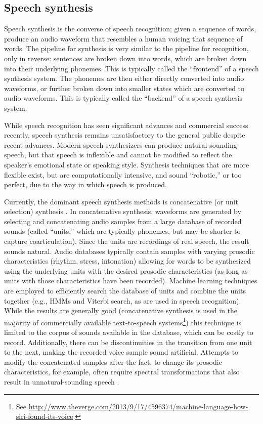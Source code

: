 \documentclass{article}
\begin{document}
\subsection{Speech synthesis}
\label{subsec:synthesis}

Speech synthesis is the converse
of speech recognition;
given a sequence of words,
produce an audio waveform
that resembles a human
voicing that sequence of words.
The pipeline for synthesis is very similar
to the pipeline for recognition,
only in reverse:
sentences are broken down into words,
which are broken down into
their underlying phonemes.
This is typically called the
``frontend'' of a speech synthesis system.
The phonemes are then either
directly converted into audio waveforms,
or further broken down into
smaller states which are converted to audio waveforms.
This is typically called the ``backend''
of a speech synthesis system.

While speech recognition
has seen significant advances
and commercial success recently,
speech synthesis remains
unsatisfactory to the general public
despite recent advances.
Modern speech synthesizers can
produce natural-sounding speech,
but that speech is inflexible
and cannot be modified
to reflect the speaker's
emotional state or speaking style.
Synthesis techniques
that are more flexible exist,
but are computationally intensive,
and sound ``robotic,''
or too perfect,
due to the way in which
speech is produced.

Currently, the dominant speech synthesis
methods is concatenative (or unit selection) synthesis
\citep{hunt1996}.
In concatenative synthesis, waveforms are generated
by selecting and concatenating audio samples
from a large database of recorded sounds
(called ``units,'' which are typically phonemes,
but may be shorter to capture coarticulation).
Since the units are recordings of real speech,
the result sounds natural.
Audio databases typically contain samples with
varying prosodic characteristics
(rhythm, stress, intonation)
allowing for words to be synthesized
using the underlying units
with the desired prosodic characteristics
(as long as units with those characteristics
have been recorded).
Machine learning techniques
are employed to efficiently search
the database of units and combine
the units together
(e.g., HMMs and Viterbi search,
as are used in speech recognition).
While the results are generally good
(concatenative synthesis is used in
the majority of commercially available
text-to-speech systems\footnote{See
  \url{http://www.theverge.com/2013/9/17/4596374/machine-language-how-siri-found-its-voice}.})
this technique is limited to the corpus
of sounds available in the database,
which can be costly to record.
Additionally, there can be discontinuities
in the transition from one unit
to the next, making the recorded
voice sample sound artificial.
Attempts to modify the concatenated
samples after the fact,
to change its prosodic characteristics,
for example, often require
spectral transformations that also
result in unnatural-sounding speech
\citep{schroder2001}.
\end{document}
